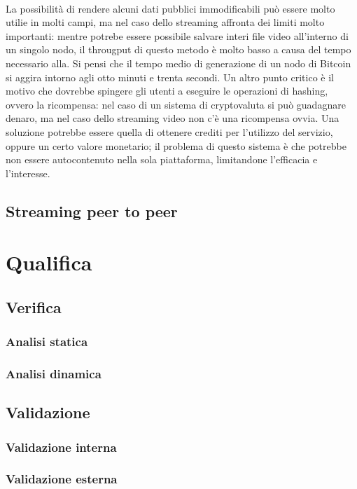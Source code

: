 	\\
	La possibilità di rendere alcuni dati pubblici immodificabili può essere molto utilie in molti campi, ma nel caso dello streaming affronta dei limiti molto importanti: mentre potrebe essere possibile salvare interi file video all'interno di un singolo nodo, il througput di questo metodo è molto basso a causa del tempo necessario alla. Si pensi che il tempo medio di generazione di un nodo di Bitcoin si aggira intorno agli otto minuti e trenta secondi. Un altro punto critico è il motivo che dovrebbe spingere gli utenti a eseguire le operazioni di hashing, ovvero la ricompensa: nel caso di un sistema di cryptovaluta si può guadagnare denaro, ma nel caso dello streaming video non c'è una ricompensa ovvia. Una soluzione potrebbe essere quella di ottenere crediti per l'utilizzo del servizio, oppure un certo valore monetario; il problema di questo sistema è che potrebbe non essere autocontenuto nella sola piattaforma, limitandone l'efficacia e l'interesse.


	\subsection{Streaming peer to peer}

\section{Qualifica}
	\subsection{Verifica}
		\subsubsection{Analisi statica}
		\subsubsection{Analisi dinamica}
	\subsection{Validazione}
		\subsubsection{Validazione interna}
		\subsubsection{Validazione esterna}